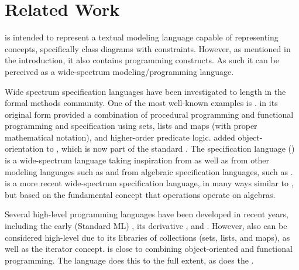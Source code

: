 
\section{Related Work}
\label{sec:related-work}

\Klang{} is intended to represent a textual modeling language capable of representing \sysml{} concepts, specifically class diagrams with constraints.
However, as mentioned in the introduction, it also contains programming constructs.
As such it can be perceived as a wide-spectrum modeling/programming language.

Wide spectrum specification languages have been investigated to length in the formal 
methods community. One of the most well-known examples is \vdm{} 
\cite{vdm78,bjoerner-jones-82,jones90,jones-shaw-90}. \vdm{} in its
original form \cite{vdm78} provided a combination of procedural programming and
functional programming and specification using sets, lists and maps (with proper 
mathematical notation), and higher-order predicate logic. \vdmpp{} 
\cite{vdmplusplus05} added object-orientation to \vdm{}, which is now part of
the \vdm{} standard \cite{vdmsl}. The \raiselang{} specification language (\rsl{})
\cite{raise92} is a wide-spectrum language taking inspiration from \vdm{} as well as 
from other modeling languages such as \zlang{} and from algebraic specification 
languages, such as \clear{}. \asml{} \cite{asml05} is a more recent wide-spectrum
specification language, in many ways similar to \vdm{}, but based on the fundamental concept that operations operate on algebras.

Several high-level programming languages have been developed in recent years,
including  the early \sml{} (Standard ML) \cite{standard-ml-97}, its derivative
\ocaml{} \cite{ocaml}, and \haskell{} \cite{haskell}. However, also \java{}
can be considered high-level due to its libraries of collections (sets, lists, and 
maps), as well as the iterator concept. \python{} \cite{python} is close to 
combining object-oriented and functional programming. The 
\scala{} \cite{scala} language does this to the full extent, as does the
\fortress{} \cite{fortress}.

